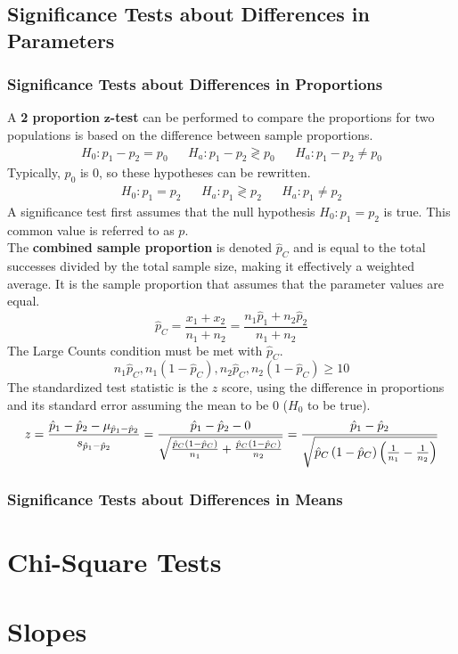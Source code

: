 \documentclass[../AP_Statistics.tex]{subfiles}
\begin{document}
		\section{Significance Tests about Differences in Parameters}
			\subsection{Significance Tests about Differences in Proportions}
				A \textbf{2 proportion} $\pmb{z}$\textbf{-test} can be performed to compare the proportions for two populations is based on the difference between sample proportions.
				\begin{align*}
					H_0:p_1 - p_2 = p_0 && H_a: p_1 - p_2 \gtrless p_0 && H_a:p_1 - p_2 \ne p_0
				\end{align*}
				Typically, $p_0$ is 0, so these hypotheses can be rewritten.
				\begin{align*}
					H_0:p_1 = p_2 && H_a:p_1 \gtrless p_2 && H_a:p_1 \ne p_2
				\end{align*}
				A significance test first assumes that the null hypothesis $H_0:p_1 = p_2$ is true. This common value is referred to as $p$. \\
				The \textbf{combined sample proportion} is denoted $\hat{p}_C$ and is equal to the total successes divided by the total sample size, making it effectively a weighted average. It is the sample proportion that assumes that the parameter values are equal.
				$$\hat{p}_C = \frac{x_1 + x_2}{n_1 + n_2} = \frac{n_1\hat{p}_1 + n_2\hat{p}_2}{n_1 + n_2}$$
				The Large Counts condition must be met with $\hat{p}_C$.
				$$n_1\hat{p}_C, n_1(1 - \hat{p}_C), n_2\hat{p}_C, n_2(1 - \hat{p}_C) \ge 10$$
				The standardized test statistic is the $z$ score, using the difference in proportions and its standard error assuming the mean to be 0 ($H_0$ to be true).
				$$z = \frac{\hat{p}_1 - \hat{p}_2 - \mu_{\hat{p}_1 - \hat{p}_2}}{s_{\hat{p}_1 - \hat{p}_2}} = \frac{\hat{p}_1 - \hat{p}_2 - 0}{\sqrt{\frac{\hat{p}_C\left(1 - \hat{p}_C\right)}{n_1} + \frac{\hat{p}_C\left(1 - \hat{p}_C\right)}{n_2}}} = \frac{\hat{p}_1 - \hat{p}_2}{\sqrt{\hat{p}_C\left(1 - \hat{p}_C\right)\left(\frac{1}{n_1} - \frac{1}{n_2}\right)}}$$
			\subsection{Significance Tests about Differences in Means}
	\chapter{Chi-Square Tests}
	\chapter{Slopes}
\end{document}
